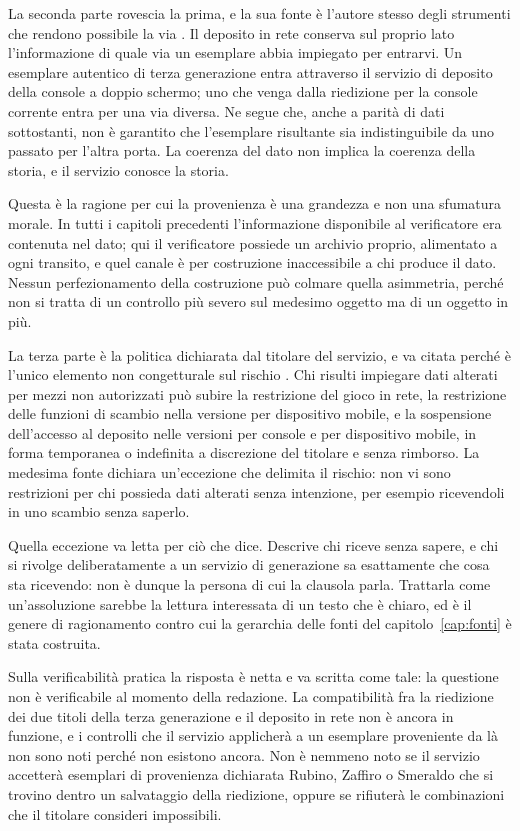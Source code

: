 La seconda parte rovescia la prima, e la sua fonte è l'autore stesso degli strumenti che rendono possibile la via \cite{mankeymite-home}. Il deposito in rete conserva sul proprio lato l'informazione di quale via un esemplare abbia impiegato per entrarvi. Un esemplare autentico di terza generazione entra attraverso il servizio di deposito della console a doppio schermo; uno che venga dalla riedizione per la console corrente entra per una via diversa. Ne segue che, anche a parità di dati sottostanti, non è garantito che l'esemplare risultante sia indistinguibile da uno passato per l'altra porta. La coerenza del dato non implica la coerenza della storia, e il servizio conosce la storia.

Questa è la ragione per cui la provenienza è una grandezza e non una sfumatura morale. In tutti i capitoli precedenti l'informazione disponibile al verificatore era contenuta nel dato; qui il verificatore possiede un archivio proprio, alimentato a ogni transito, e quel canale è per costruzione inaccessibile a chi produce il dato. Nessun perfezionamento della costruzione può colmare quella asimmetria, perché non si tratta di un controllo più severo sul medesimo oggetto ma di un oggetto in più.

La terza parte è la politica dichiarata dal titolare del servizio, e va citata perché è l'unico elemento non congetturale sul rischio \cite{tpc-dati-alterati}. Chi risulti impiegare dati alterati per mezzi non autorizzati può subire la restrizione del gioco in rete, la restrizione delle funzioni di scambio nella versione per dispositivo mobile, e la sospensione dell'accesso al deposito nelle versioni per console e per dispositivo mobile, in forma temporanea o indefinita a discrezione del titolare e senza rimborso. La medesima fonte dichiara un'eccezione che delimita il rischio: non vi sono restrizioni per chi possieda dati alterati senza intenzione, per esempio ricevendoli in uno scambio senza saperlo.

Quella eccezione va letta per ciò che dice. Descrive chi riceve senza sapere, e chi si rivolge deliberatamente a un servizio di generazione sa esattamente che cosa sta ricevendo: non è dunque la persona di cui la clausola parla. Trattarla come un'assoluzione sarebbe la lettura interessata di un testo che è chiaro, ed è il genere di ragionamento contro cui la gerarchia delle fonti del capitolo~\ref{cap:fonti} è stata costruita.

Sulla verificabilità pratica la risposta è netta e va scritta come tale: la questione non è verificabile al momento della redazione. La compatibilità fra la riedizione dei due titoli della terza generazione e il deposito in rete non è ancora in funzione, e i controlli che il servizio applicherà a un esemplare proveniente da là non sono noti perché non esistono ancora. Non è nemmeno noto se il servizio accetterà esemplari di provenienza dichiarata Rubino, Zaffiro o Smeraldo che si trovino dentro un salvataggio della riedizione, oppure se rifiuterà le combinazioni che il titolare consideri impossibili.

